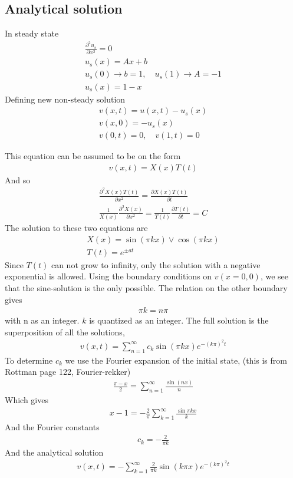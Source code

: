 \documentclass[11pt,a4paper,draft]{article}
\numberwithin{equation}{section}
\begin{document}
\subsection{Analytical solution}
In steady state
\begin{gather}
\frac{\partial^2 u_s}{\partial x^2} = 0\\
u_s(x) = Ax + b\\
u_s(0) \to b = 1, \quad
u_s(1) \to A = -1\\
u_s(x) = 1-x
\end{gather}
Defining new non-steady solution
\begin{gather}
v(x,t) = u(x,t) - u_s(x)\\
v(x,0) = -u_s(x)\\
v(0,t) = 0, \quad v(1, t) = 0
\end{gather}

This equation can be assumed to be on the form
\begin{gather}
v(x,t) = X(x)T(t)
\end{gather}
And so
\begin{gather}
\frac{\partial^2 X(x)T(t)}{\partial x^2}
= \frac{\partial X(x)T(t)}{\partial t}\\
\frac{1}{X(x)}\frac{\partial^2 X(x)}{\partial x^2}
 = \frac{1}{T(t)}\frac{\partial T(t)}{\partial t} = C
 \label{eq:coupled_constant}
\end{gather}
The solution to these two equations are 
\begin{gather}
X(x) = \sin(\pi kx) \lor \cos(\pi kx)\\
T(t) = e^{\pm at}
\end{gather}
Since $T(t)$ can not grow to infinity, only the solution with a 
negative exponential is allowed. Using the boundary conditions on 
$v(x=0,0)$, we see that the sine-solution is the only possible.
The relation on the other boundary gives 
\begin{gather}
\pi k = n\pi
\end{gather}
with n as an integer. $k$ is quantized as an integer. The full solution 
is the superposition of all the solutions,
\begin{gather}
v(x,t) = \sum_{n=1}^\infty c_k \sin(\pi kx)e^{-(k\pi)^2t}
\end{gather}
To determine $c_k$ we use the Fourier expansion of the initial 
state, (this is from Rottman page 122, Fourier-rekker)
\begin{gather}
\frac{\pi - x}{2} = \sum_{n=1}^\infty \frac{\sin(nx)}{n}
\end{gather}
Which gives
\begin{gather}
x-1 = -\frac{2}{\pi}\sum_{k=1}^\infty \frac{\sin\pi kx}{k}
\end{gather}
And the Fourier constants
\begin{gather}
c_k = -\frac{2}{\pi k}
\end{gather}
And the analytical solution
\begin{gather}
v(x,t) = -\sum_{k=1}^\infty \frac{2}{\pi k}\sin(k\pi x)e^{-(k\pi)^2t}
\end{gather}
\end{document}
